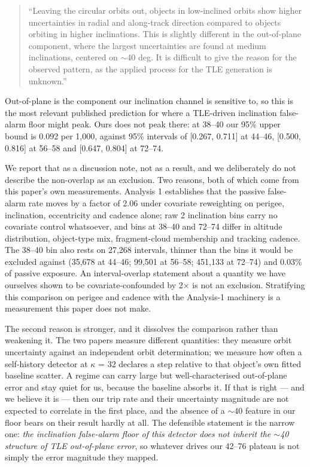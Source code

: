 \documentclass[11pt]{article}
\begin{document}
\begin{quote}
``Leaving the circular orbits out, objects in low-inclined orbits show higher uncertainties in radial and along-track direction compared to objects orbiting in higher inclinations. This is slightly different in the out-of-plane component, where the largest uncertainties are found at medium inclinations, centered on $\sim$40 deg. It is difficult to give the reason for the observed pattern, as the applied process for the TLE generation is unknown.''
\end{quote}

Out-of-plane is the component our inclination channel is sensitive to, so this is the most relevant published prediction for where a TLE-driven inclination false-alarm floor might peak. Ours does not peak there: at 38--40\textdegree{} our 95\% upper bound is 0.092 per 1,000, against 95\% intervals of [0.267, 0.711] at 44--46\textdegree{}, [0.500, 0.816] at 56--58\textdegree{} and [0.647, 0.804] at 72--74\textdegree{}.

We report that as a discussion note, not as a result, and we deliberately do not describe the non-overlap as an exclusion. Two reasons, both of which come from this paper's own measurements. Analysis 1 establishes that the passive false-alarm rate moves by a factor of 2.06 under covariate reweighting on perigee, inclination, eccentricity and cadence alone; raw 2\textdegree{} inclination bins carry no covariate control whatsoever, and bins at 38--40\textdegree{} and 72--74\textdegree{} differ in altitude distribution, object-type mix, fragment-cloud membership and tracking cadence. The 38--40\textdegree{} bin also rests on 27,268 intervals, thinner than the bins it would be excluded against (35,678 at 44--46\textdegree{}; 99,501 at 56--58\textdegree{}; 451,133 at 72--74\textdegree{}) and 0.03\% of passive exposure. An interval-overlap statement about a quantity we have ourselves shown to be covariate-confounded by 2$\times$ is not an exclusion. Stratifying this comparison on perigee and cadence with the Analysis-1 machinery is a measurement this paper does not make.

The second reason is stronger, and it dissolves the comparison rather than weakening it. The two papers measure different quantities: they measure orbit uncertainty against an independent orbit determination; we measure how often a self-history detector at $\kappa$ = 32 declares a step relative to that object's own fitted baseline scatter. A regime can carry large but well-characterised out-of-plane error and stay quiet for us, because the baseline absorbs it. If that is right --- and we believe it is --- then our trip rate and their uncertainty magnitude are not expected to correlate in the first place, and the absence of a $\sim$40\textdegree{} feature in our floor bears on their result hardly at all. The defensible statement is the narrow one: \emph{the inclination false-alarm floor of this detector does not inherit the $\sim$40\textdegree{} structure of TLE out-of-plane error}, so whatever drives our 42--76\textdegree{} plateau is not simply the error magnitude they mapped.
\end{document}
